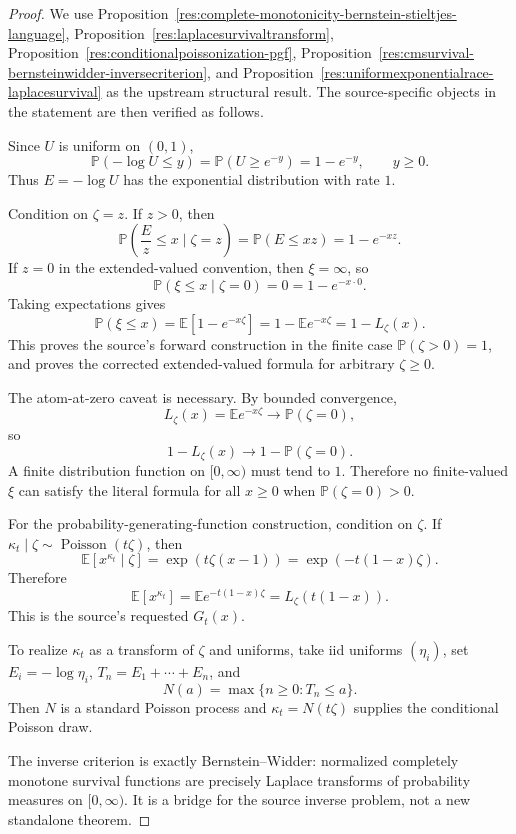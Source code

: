 \documentclass[11pt]{article}
\numberwithin{equation}{section}
\theoremstyle{definition}
\theoremstyle{remark}
\newcommand{\1}{\mathbf 1}
\begin{document}
\begin{proof}
We use Proposition~\ref{res:complete-monotonicity-bernstein-stieltjes-language}, Proposition~\ref{res:laplacesurvivaltransform}, Proposition~\ref{res:conditionalpoissonization-pgf}, Proposition~\ref{res:cmsurvival-bernsteinwidder-inversecriterion}, and Proposition~\ref{res:uniformexponentialrace-laplacesurvival} as the upstream structural result. The source-specific objects in the statement are then verified as follows.

Since \(U\) is uniform on \((0,1)\),
\[
\mathbb P(-\log U\le y)=\mathbb P(U\ge e^{-y})=1-e^{-y},\qquad y\ge0.
\]
Thus \(E=-\log U\) has the exponential distribution with rate \(1\).

Condition on \(\zeta=z\). If \(z>0\), then
\[
\mathbb P\left(\frac{E}{z}\le x\mid \zeta=z\right)
=\mathbb P(E\le xz)=1-e^{-xz}.
\]
If \(z=0\) in the extended-valued convention, then \(\xi=\infty\), so
\[
\mathbb P(\xi\le x\mid \zeta=0)=0=1-e^{-x\cdot 0}.
\]
Taking expectations gives
\[
\mathbb P(\xi\le x)
=\mathbb E[1-e^{-x\zeta}]
=1-\mathbb E e^{-x\zeta}
=1-L_\zeta(x).
\]
This proves the source's forward construction in the finite case \(\mathbb P(\zeta>0)=1\), and proves the corrected extended-valued formula for arbitrary \(\zeta\ge0\).

The atom-at-zero caveat is necessary. By bounded convergence,
\[
L_\zeta(x)=\mathbb E e^{-x\zeta}\longrightarrow \mathbb P(\zeta=0),
\]
so
\[
1-L_\zeta(x)\longrightarrow 1-\mathbb P(\zeta=0).
\]
A finite distribution function on \([0,\infty)\) must tend to \(1\). Therefore no finite-valued \(\xi\) can satisfy the literal formula for all \(x\ge0\) when \(\mathbb P(\zeta=0)>0\).

For the probability-generating-function construction, condition on \(\zeta\). If \(\kappa_t\mid \zeta\sim\operatorname{Poisson}(t\zeta)\), then
\[
\mathbb E[x^{\kappa_t}\mid\zeta]
=\exp(t\zeta(x-1))
=\exp(-t(1-x)\zeta).
\]
Therefore
\[
\mathbb E[x^{\kappa_t}]
=\mathbb E e^{-t(1-x)\zeta}
=L_\zeta(t(1-x)).
\]
This is the source's requested \(G_t(x)\).

To realize \(\kappa_t\) as a transform of \(\zeta\) and uniforms, take iid uniforms \((\eta_i)\), set \(E_i=-\log\eta_i\), \(T_n=E_1+\cdots+E_n\), and
\[
N(a)=\max\{n\ge0:T_n\le a\}.
\]
Then \(N\) is a standard Poisson process and \(\kappa_t=N(t\zeta)\) supplies the conditional Poisson draw.

The inverse criterion is exactly Bernstein--Widder: normalized completely monotone survival functions are precisely Laplace transforms of probability measures on \([0,\infty)\). It is a bridge for the source inverse problem, not a new standalone theorem.
\end{proof}
\end{document}
